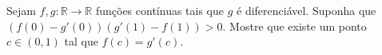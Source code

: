Sejam \(f,g\colon \mathbb R\to\mathbb R\) funções contínuas tais que \(g\) é diferenciável. Suponha que \((f(0)-g'(0))(g'(1)-f(1))>0\). Mostre que existe um ponto \(c\in (0,1)\) tal que \(f(c)=g'(c)\).
